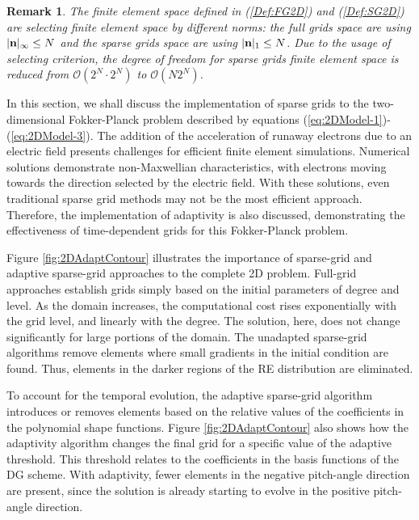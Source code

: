\documentclass[preprint,11pt]{elsarticle}
\newtheorem{remark}{Remark}[section]
\begin{document}
\begin{remark}
The finite element space defined in (\ref{Def:FG2D}) and (\ref{Def:SG2D}) are selecting finite element space by different norms: the full grids space are using $|{\bf n}|_{\infty}\le N$ and the sparse grids space are using $|{\bf n}|_1\le N$. Due to the usage of selecting criterion, the degree of freedom for sparse grids finite element space is reduced from $\mathcal{O}(2^N\cdot 2^N)$ to $\mathcal{O}(N2^N)$.
\end{remark}
In this section, we shall discuss the implementation of sparse grids to the two-dimensional Fokker-Planck problem described by equations (\ref{eq:2DModel-1})-(\ref{eq:2DModel-3}). The addition of the acceleration of runaway electrons due to an electric field presents challenges for efficient finite element simulations. Numerical solutions demonstrate non-Maxwellian characteristics, with electrons moving towards the direction selected by the electric field. With these solutions, even traditional sparse grid methods may not be the most efficient approach. Therefore, the implementation of adaptivity is also discussed, demonstrating the effectiveness of time-dependent grids for this Fokker-Planck problem. 

Figure \ref{fig:2DAdaptContour} illustrates the importance of sparse-grid and adaptive sparse-grid approaches to the complete 2D problem. Full-grid approaches establish grids simply based on the initial parameters of degree and level. As the domain increases, the computational cost rises exponentially with the grid level, and linearly with the degree. The solution, here, does not change significantly for large portions of the domain. The unadapted sparse-grid algorithms remove elements where small gradients in the initial condition are found. Thus, elements in the darker regions of the RE distribution are eliminated. 

To account for the temporal evolution, the adaptive sparse-grid algorithm introduces or removes elements based on the relative values of the coefficients in the polynomial shape functions. Figure \ref{fig:2DAdaptContour} also shows how the adaptivity algorithm changes the final grid for a specific value of the adaptive threshold. This threshold relates to the coefficients in the basis functions of the DG scheme. With adaptivity, fewer elements in the negative pitch-angle direction are present, since the solution is already starting to evolve in the positive pitch-angle direction. 
\end{document}
